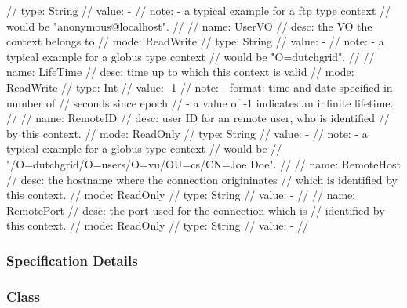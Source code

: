 \begin{myspec}
{{      //   type:  String
      //   value: -
      //   note:  - a typical example for a ftp type context 
      //            would be "anonymous@localhost".
      //
      //   name:  UserVO
      //   desc:  the VO the context belongs to
      //   mode:  ReadWrite
      //   type:  String
      //   value: -
      //   note:  - a typical example for a globus type context 
      //            would be "O=dutchgrid".
      //
      //   name:  LifeTime
      //   desc:  time up to which this context is valid
      //   mode:  ReadWrite
      //   type:  Int
      //   value: -1
      //   note:  - format: time and date specified in number of 
      //            seconds since epoch
      //          - a value of -1 indicates an infinite lifetime.
      //
      //   name:  RemoteID
      //   desc:  user ID for an remote user, who is identified
      //          by this context.
      //   mode:  ReadOnly
      //   type:  String
      //   value: -
      //   note:  - a typical example for a globus type context 
      //            would be
      //            "/O=dutchgrid/O=users/O=vu/OU=cs/CN=Joe Doe".
      //
      //   name:  RemoteHost
      //   desc:  the hostname where the connection origininates
      //          which is identified by this context.
      //   mode:  ReadOnly
      //   type:  String
      //   value: -
      //
      //   name:  RemotePort
      //   desc:  the port used for the connection which is
      //          identified by this context.
      //   mode:  ReadOnly
      //   type:  String
      //   value: -
      //
    }
  }
 \end{myspec}
 
 
 \subsubsection{Specification Details}
 
 \subsubsection*{Class }
 
